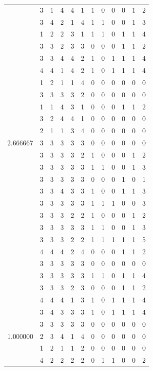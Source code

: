 \documentclass[]{book}
\theoremstyle{definition}
\theoremstyle{definition}
\theoremstyle{definition}
\theoremstyle{remark}
\begin{document}
\begin{table}
{\begin{tabular}[t]{rrrrrrrrrrrr}
 & 3 & 1 & 4 & 4 & 1 & 1 & 0 & 0 & 0 & 1 & 2\\
 & 3 & 4 & 2 & 1 & 4 & 1 & 1 & 0 & 0 & 1 & 3\\
 & 1 & 2 & 2 & 3 & 1 & 1 & 1 & 0 & 1 & 1 & 4\\
 & 3 & 3 & 2 & 3 & 3 & 0 & 0 & 0 & 1 & 1 & 2\\
 & 3 & 3 & 4 & 4 & 2 & 1 & 0 & 1 & 1 & 1 & 4\\
 & 4 & 4 & 1 & 4 & 2 & 1 & 0 & 1 & 1 & 1 & 4\\
 & 1 & 2 & 1 & 1 & 4 & 0 & 0 & 0 & 0 & 0 & 0\\
 & 3 & 3 & 3 & 3 & 2 & 0 & 0 & 0 & 0 & 0 & 0\\
 & 1 & 1 & 4 & 3 & 1 & 0 & 0 & 0 & 1 & 1 & 2\\
 & 3 & 2 & 4 & 4 & 1 & 0 & 0 & 0 & 0 & 0 & 0\\
 & 2 & 1 & 1 & 3 & 4 & 0 & 0 & 0 & 0 & 0 & 0\\
2.666667 & 3 & 3 & 3 & 3 & 3 & 0 & 0 & 0 & 0 & 0 & 0\\
 & 3 & 3 & 3 & 3 & 2 & 1 & 0 & 0 & 0 & 1 & 2\\
 & 3 & 3 & 3 & 3 & 3 & 1 & 1 & 0 & 0 & 1 & 3\\
 & 3 & 3 & 3 & 3 & 3 & 0 & 0 & 0 & 1 & 0 & 1\\
 & 3 & 3 & 4 & 3 & 3 & 1 & 0 & 0 & 1 & 1 & 3\\
 & 3 & 3 & 3 & 3 & 3 & 1 & 1 & 1 & 0 & 0 & 3\\
 & 3 & 3 & 3 & 2 & 2 & 1 & 0 & 0 & 0 & 1 & 2\\
 & 3 & 3 & 3 & 3 & 3 & 1 & 1 & 0 & 0 & 1 & 3\\
 & 3 & 3 & 3 & 2 & 2 & 1 & 1 & 1 & 1 & 1 & 5\\
 & 4 & 4 & 4 & 2 & 4 & 0 & 0 & 0 & 1 & 1 & 2\\
 & 3 & 3 & 3 & 3 & 3 & 0 & 0 & 0 & 0 & 0 & 0\\
 & 3 & 3 & 3 & 3 & 3 & 1 & 1 & 0 & 1 & 1 & 4\\
 & 3 & 3 & 3 & 2 & 3 & 0 & 0 & 0 & 1 & 1 & 2\\
 & 4 & 4 & 4 & 1 & 3 & 1 & 0 & 1 & 1 & 1 & 4\\
 & 3 & 4 & 3 & 3 & 3 & 1 & 0 & 1 & 1 & 1 & 4\\
 & 3 & 3 & 3 & 3 & 3 & 0 & 0 & 0 & 0 & 0 & 0\\
1.000000 & 2 & 3 & 4 & 1 & 4 & 0 & 0 & 0 & 0 & 0 & 0\\
 & 1 & 2 & 1 & 1 & 2 & 0 & 0 & 0 & 0 & 0 & 0\\
 & 4 & 2 & 2 & 2 & 2 & 0 & 1 & 1 & 0 & 0 & 2\\

\end{tabular}}
\end{table}
\end{document}
